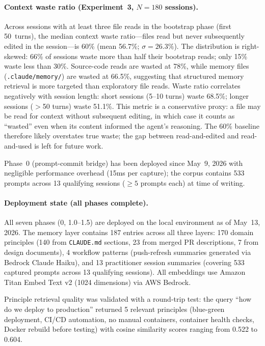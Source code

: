 \documentclass[11pt]{article}
\begin{document}
\paragraph{Context waste ratio (Experiment~3, $N{=}180$ sessions).}
Across sessions with at least three file reads in the bootstrap phase (first 50~turns), the median context waste ratio---files read but never subsequently edited in the session---is 60\% (mean 56.7\%; $\sigma{=}26.3\%$).
The distribution is right-skewed: 66\% of sessions waste more than half their bootstrap reads; only 15\% waste less than 30\%.
Source-code reads are wasted at 78\%, while memory files (\texttt{.claude/memory/}) are wasted at 66.5\%, suggesting that structured memory retrieval is more targeted than exploratory file reads.
Waste ratio correlates negatively with session length: short sessions (5--10 turns) waste 68.5\%; longer sessions ($>$50 turns) waste 51.1\%.
This metric is a conservative proxy: a file may be read for context without subsequent editing, in which case it counts as ``wasted'' even when its content informed the agent's reasoning. The 60\% baseline therefore likely overstates true waste; the gap between read-and-edited and read-and-used is left for future work.

Phase~0 (prompt-commit bridge) has been deployed since May~9, 2026 with negligible performance overhead (15ms per capture); the corpus contains 533 prompts across 13 qualifying sessions (${\geq}5$ prompts each) at time of writing.

\paragraph{Deployment state (all phases complete).}
All seven phases (0, 1.0--1.5) are deployed on the local environment as of May~13, 2026.
The memory layer contains 187 entries across all three layers: 170 domain principles (140 from \texttt{CLAUDE.md} sections, 23 from merged PR descriptions, 7 from design documents), 4 workflow patterns (push-refresh summaries generated via Bedrock Claude Haiku), and 13 practitioner session summaries (covering 533 captured prompts across 13 qualifying sessions).
All embeddings use Amazon Titan Embed Text v2 (1024 dimensions) via AWS Bedrock.

Principle retrieval quality was validated with a round-trip test: the query ``how do we deploy to production'' returned 5 relevant principles (blue-green deployment, CI/CD automation, no manual containers, container health checks, Docker rebuild before testing) with cosine similarity scores ranging from 0.522 to 0.604.
\end{document}
